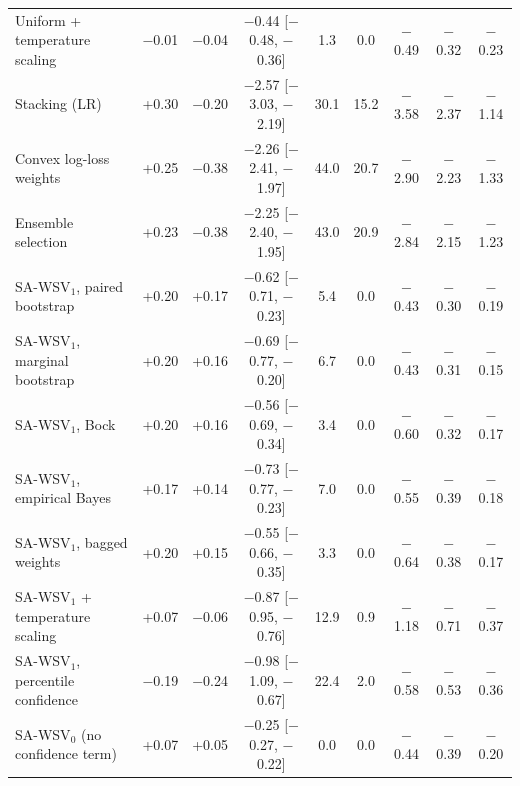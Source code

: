 \begin{table}[!htbp]
\begin{tabular}{lcccccccc}
Uniform + temperature scaling & $-$0.01 & $-$0.04 & $-$0.44 [$-$0.48, $-$0.36] & 1.3 & 0.0 & $-$0.49 & $-$0.32 & $-$0.23 \\
Stacking (LR) & +0.30 & $-$0.20 & $-$2.57 [$-$3.03, $-$2.19] & 30.1 & 15.2 & $-$3.58 & $-$2.37 & $-$1.14 \\
Convex log-loss weights & +0.25 & $-$0.38 & $-$2.26 [$-$2.41, $-$1.97] & 44.0 & 20.7 & $-$2.90 & $-$2.23 & $-$1.33 \\
Ensemble selection & +0.23 & $-$0.38 & $-$2.25 [$-$2.40, $-$1.95] & 43.0 & 20.9 & $-$2.84 & $-$2.15 & $-$1.23 \\
SA-WSV$_1$, paired bootstrap & +0.20 & +0.17 & $-$0.62 [$-$0.71, $-$0.23] & 5.4 & 0.0 & $-$0.43 & $-$0.30 & $-$0.19 \\
SA-WSV$_1$, marginal bootstrap & +0.20 & +0.16 & $-$0.69 [$-$0.77, $-$0.20] & 6.7 & 0.0 & $-$0.43 & $-$0.31 & $-$0.15 \\
SA-WSV$_1$, Bock & +0.20 & +0.16 & $-$0.56 [$-$0.69, $-$0.34] & 3.4 & 0.0 & $-$0.60 & $-$0.32 & $-$0.17 \\
SA-WSV$_1$, empirical Bayes & +0.17 & +0.14 & $-$0.73 [$-$0.77, $-$0.23] & 7.0 & 0.0 & $-$0.55 & $-$0.39 & $-$0.18 \\
SA-WSV$_1$, bagged weights & +0.20 & +0.15 & $-$0.55 [$-$0.66, $-$0.35] & 3.3 & 0.0 & $-$0.64 & $-$0.38 & $-$0.17 \\
SA-WSV$_1$ + temperature scaling & +0.07 & $-$0.06 & $-$0.87 [$-$0.95, $-$0.76] & 12.9 & 0.9 & $-$1.18 & $-$0.71 & $-$0.37 \\
SA-WSV$_1$, percentile confidence & $-$0.19 & $-$0.24 & $-$0.98 [$-$1.09, $-$0.67] & 22.4 & 2.0 & $-$0.58 & $-$0.53 & $-$0.36 \\
SA-WSV$_0$ (no confidence term) & +0.07 & +0.05 & $-$0.25 [$-$0.27, $-$0.22] & 0.0 & 0.0 & $-$0.44 & $-$0.39 & $-$0.20 \\
\bottomrule\end{tabular}\end{table}

